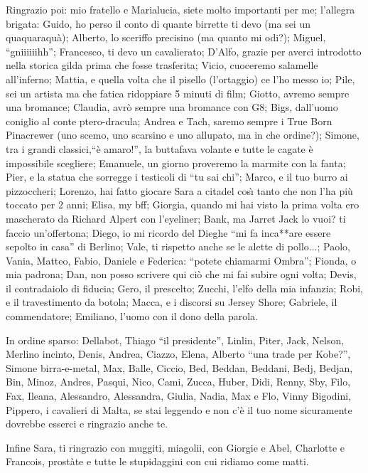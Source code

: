Ringrazio poi: mio fratello e Marialucia, siete molto importanti per me; l'allegra brigata: Guido, ho perso il conto di quante birrette ti devo (ma sei un quaquaraqu\`a); Alberto, lo sceriffo precisino (ma quanto mi odi?); Miguel, ``gniiiiiihh''; Francesco, ti devo un cavalierato; D'Alfo, grazie per averci introdotto nella storica gilda prima che fosse trasferita; Vicio, cuoceremo salamelle all'inferno; Mattia, e quella volta che il pisello (l'ortaggio) ce l'ho messo io; Pile, sei un artista ma che fatica ridoppiare 5 minuti di film; Giotto, avremo sempre una bromance; Claudia, avr\`o sempre una bromance con G8; Bigs, dall'uomo coniglio al conte ptero-dracula; Andrea e Tach, saremo sempre i True Born Pinacrewer (uno scemo, uno scarsino e uno allupato, ma in che ordine?); Simone, tra i grandi classici,``\`e amaro!'', la buttafava volante e tutte le cagate \`e impossibile scegliere; Emanuele, un giorno proveremo la marmite con la fanta; Pier, e la statua che sorregge i testicoli di ``tu sai chi''; Marco, e il tuo burro ai pizzoccheri; Lorenzo, hai fatto giocare Sara a citadel cos{\`\i} tanto che non l'ha pi\`u toccato per 2 anni; Elisa, my bff; Giorgia, quando mi hai visto la prima volta ero mascherato da Richard Alpert con l'eyeliner; Bank, ma Jarret Jack lo vuoi? ti faccio un'offertona; Diego, io mi ricordo del Dieghe ``mi fa inca**are essere sepolto in casa'' di Berlino; Vale, ti rispetto anche se le alette di pollo...; Paolo, Vania, Matteo, Fabio, Daniele e Federica: ``potete chiamarmi Ombra''; Fionda, o mia padrona; Dan, non posso scrivere qui ci\`o che mi fai subire ogni volta; Devis, il contradaiolo di fiducia; Gero, il prescelto; Zucchi, l'elfo della mia infanzia; Robi, e il travestimento da botola; Macca, e i discorsi su Jersey Shore; Gabriele, il commendatore; Emiliano, l'uomo con il dono della parola.

In ordine sparso: Dellabot, Thiago ``il presidente'', Linlin, Piter, Jack, Nelson, Merlino incinto, Denis, Andrea, Ciazzo, Elena, Alberto ``una trade per Kobe?'', Simone birra-e-metal, Max, Balle, Ciccio, Bed, Beddan, Beddani, Bedj, Bedjan, Bin, Minoz, Andres, Pasqui, Nico, Cami, Zucca, Huber, Didi, Renny, Sby, Filo, Fax, Ileana, Alessandro, Alessandra, Giulia, Nadia, Max e Flo, Vinny Bigodini, Pippero, i cavalieri di Malta, se stai leggendo e non c'\`e il tuo nome sicuramente dovrebbe esserci e ringrazio anche te.

Infine Sara, ti ringrazio con muggiti, miagolii, con Giorgie e Abel, Charlotte e Francois, prost\`ate e tutte le stupidaggini con cui ridiamo come matti.



